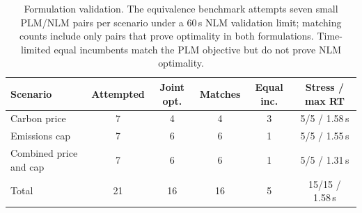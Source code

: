 \begin{table}[!htbp]\centering\scriptsize
\setlength{\tabcolsep}{4pt}
\caption{Formulation validation. The equivalence benchmark attempts seven small PLM/NLM pairs per scenario under a 60\,s NLM validation limit; matching counts include only pairs that prove optimality in both formulations. Time-limited equal incumbents match the PLM objective but do not prove NLM optimality.}\label{tab:plmnlm}
\begin{tabular}{lccccc}
\toprule
Scenario & Attempted & Joint opt. & Matches & Equal inc. & Stress / max RT\\
\midrule
Carbon price & 7 & 4 & 4 & 3 & 5/5 / 1.58\,s\\
Emissions cap & 7 & 6 & 6 & 1 & 5/5 / 1.55\,s\\
Combined price and cap & 7 & 6 & 6 & 1 & 5/5 / 1.31\,s\\
\midrule
Total & 21 & 16 & 16 & 5 & 15/15 / 1.58\,s\\
\bottomrule
\end{tabular}
\end{table}
